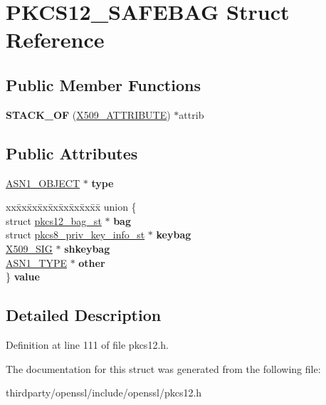 \hypertarget{struct_p_k_c_s12___s_a_f_e_b_a_g}{}\section{P\+K\+C\+S12\+\_\+\+S\+A\+F\+E\+B\+AG Struct Reference}
\label{struct_p_k_c_s12___s_a_f_e_b_a_g}
\subsection*{Public Member Functions}
\begin{DoxyCompactItemize}
\item 
\mbox{\label{struct_p_k_c_s12___s_a_f_e_b_a_g_a6026c2284c1b8dded9083ef57966e88d}} 
{\bfseries S\+T\+A\+C\+K\+\_\+\+OF} (\hyperlink{structx509__attributes__st}{X509\+\_\+\+A\+T\+T\+R\+I\+B\+U\+TE}) $\ast$attrib
\end{DoxyCompactItemize}
\subsection*{Public Attributes}
\begin{DoxyCompactItemize}
\item 
\mbox{\label{struct_p_k_c_s12___s_a_f_e_b_a_g_a7e25098bf7d75c05613960d6c9a0e554}} 
\hyperlink{structasn1__object__st}{A\+S\+N1\+\_\+\+O\+B\+J\+E\+CT} $\ast$ {\bfseries type}
\item 
\mbox{\label{struct_p_k_c_s12___s_a_f_e_b_a_g_ad0ed4843f1f345316ec09e181f3d5669}} 
\begin{tabbing}
xx\=xx\=xx\=xx\=xx\=xx\=xx\=xx\=xx\=\kill
union \{\\
\>struct \hyperlink{structpkcs12__bag__st}{pkcs12\_bag\_st} $\ast$ {\bfseries bag}\\
\>struct \hyperlink{structpkcs8__priv__key__info__st}{pkcs8\_priv\_key\_info\_st} $\ast$ {\bfseries keybag}\\
\>\hyperlink{struct_x509__sig__st}{X509\_SIG} $\ast$ {\bfseries shkeybag}\\
\>\hyperlink{structasn1__type__st}{ASN1\_TYPE} $\ast$ {\bfseries other}\\
\} {\bfseries value}\\

\end{tabbing}\end{DoxyCompactItemize}


\subsection{Detailed Description}


Definition at line 111 of file pkcs12.\+h.



The documentation for this struct was generated from the following file\+:\begin{DoxyCompactItemize}
\item 
thirdparty/openssl/include/openssl/pkcs12.\+h\end{DoxyCompactItemize}
